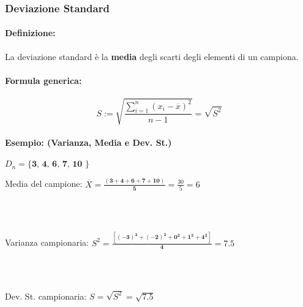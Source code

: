 \documentclass[]{article}
\newcommand{\formula}{\paragraph{Formula generica:}}
\begin{document}
    \subsubsection{Deviazione Standard}
    \paragraph{Definizione:} La deviazione standard è la \textbf{media} degli scarti degli elementi di un campiona. 
    \formula
    \[ S := \sqrt{\frac{\sum_{i = 1}^{n} (x_i - \overline{x})^2}{n-1}} = \sqrt{S^2} \]
    \paragraph{Esempio: (Varianza, Media e Dev. St.)} $D_n = \textbf{\{ 3, 4, 6, 7, 10 \}}$ \\
    \linebreak[4]
    \centerline{Media del campione: $ \overline{X} = \boldsymbol{\frac{( 3 + 4 + 6 + 7 + 10)}{5}} = \frac{30}{5} = 6 $} \\ \\
    \centerline{Varianza campionaria: $ S^2 = \boldsymbol{\frac{[ (-3)^2 + (-2)^2 + 0^2 + 1^2 + 4^2 ]}{4}} = 7.5 $} \\ \\
    \centerline{Dev. St. campionaria: $ S = \sqrt{S^2} = \sqrt{7.5}$} \\
\end{document}
